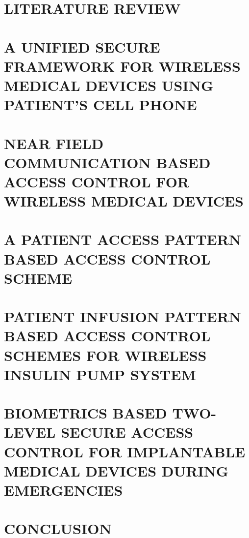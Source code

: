 \documentclass[reqno,12pt,oneside]{report} %
\begin{document}
\chapter{LITERATURE REVIEW}
 \label{chap:2}
 

\chapter{A UNIFIED SECURE FRAMEWORK FOR WIRELESS MEDICAL DEVICES USING PATIENT'S CELL PHONE}
 \label{chap:3}
 

\chapter{NEAR FIELD COMMUNICATION BASED ACCESS CONTROL FOR WIRELESS MEDICAL DEVICES}
 \label{chap:4}
 

\chapter{A PATIENT ACCESS PATTERN BASED ACCESS CONTROL SCHEME}
 \label{chap:5}
 

\chapter{PATIENT INFUSION PATTERN BASED ACCESS CONTROL SCHEMES FOR WIRELESS INSULIN PUMP SYSTEM}
 \label{chap:6}
 

\chapter{BIOMETRICS BASED TWO-LEVEL SECURE ACCESS CONTROL FOR IMPLANTABLE MEDICAL DEVICES DURING EMERGENCIES}
 \label{chap:7}
 

\chapter{CONCLUSION}
 \label{chap:8}
 


\startbibliography
 \begin{singlespace} %
  
  
 \end{singlespace}

 \startappendices
 \label{Carelink USB Driver Decoding}
 
\end{document}
